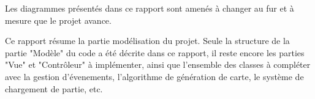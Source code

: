 Les diagrammes présentés dans ce rapport sont amenés à changer au fur et à mesure que le projet avance.

Ce rapport résume la partie modélisation du projet. Seule la structure de la partie "Modèle" du code a été décrite dans ce rapport, il reste encore les parties "Vue" et "Contrôleur" à implémenter, ainsi que l'ensemble des classes à compléter avec la gestion d'évenements, l'algorithme de génération de carte, le système de chargement de partie, etc.


